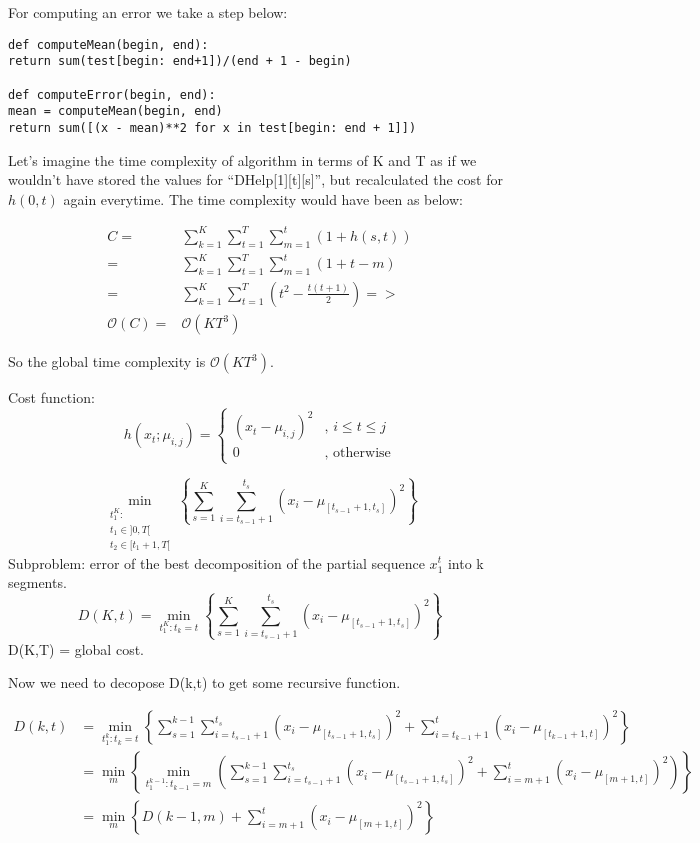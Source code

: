 For computing an error we take a step below: \\
\begin{lstlisting}
def computeMean(begin, end):
return sum(test[begin: end+1])/(end + 1 - begin)

def computeError(begin, end):
mean = computeMean(begin, end)
return sum([(x - mean)**2 for x in test[begin: end + 1]])	
\end{lstlisting}

Let's imagine the time complexity of algorithm in terms of K and T as if we wouldn't have 
stored the values for ``DHelp[1][t][s]'', but recalculated the cost for $h(0,t)$ again everytime.
The time complexity would have been as below:  

\begin{align}
C =& \sum_{k=1}^{K}\sum_{t=1}^{T}\sum_{m=1}^{t}(1 + h(s,t)) \\
  =& \sum_{k=1}^{K}\sum_{t=1}^{T}\sum_{m=1}^{t}(1 + t-m) \\
  =& \sum_{k=1}^{K}\sum_{t=1}^{T}(t^2- \frac{t(t+1)}{2}) => \\
\mathcal{O}(C) =& \mathcal{O}(KT^3)
\end{align}

So the global time complexity is $\mathcal{O}(KT^3)$.

Cost function: 
\[h(x_t;\mu_{i,j})=
\begin{cases}
(x_t-\mu_{i,j})^2 & \text{, } i\leq t\leq j\\
0 & \text{, otherwise}
\end{cases}\]

\[\min_{\substack{t_1^K:\\t_1\in]0,T[\\t_2\in[t_1+1,T[}}
{\left\{\sum_{s=1}^{K}
{\sum_{i=t_{s-1}+1}^{t_s}
{\left(x_i-\mu_{[t_{s-1}+1,t_s]}\right)^2}}\right\}}\]
Subproblem: error of the best decomposition of the partial sequence \(x_1^t\) into k segments.
\[D(K,t)=\min_{t_1^K:t_k=t}
{\left\{\sum_{s=1}^{K}
{\sum_{i=t_{s-1}+1}^{t_s}
{\left(x_i-\mu_{[t_{s-1}+1,t_s]}\right)^2}}\right\}}\]
D(K,T) = global cost.

Now we need to decopose D(k,t) to get some recursive function.

\begin{equation*}
\begin{aligned}
D(k,t)&=\min_{t_1^k:t_k=t}
{\left\{\sum_{s=1}^{k-1}
{\sum_{i=t_{s-1}+1}^{t_s}
{\left(x_i-\mu_{[t_{s-1}+1,t_s]}\right)^2+
\sum_{i=t_{k-1}+1}^{t}
{\left(x_i-\mu_{[t_{k-1}+1,t]}\right)^2}}}\right\}}\\
&=\min_{m}
{\left\{\min_{t_1^{k-1}:t_{k-1}=m}
{\left(\sum_{s=1}^{k-1}
{\sum_{i=t_{s-1}+1}^{t_s}
{\left(x_i-\mu_{[t_{s-1}+1,t_s]}\right)^2+
\sum_{i=m+1}^{t}
{\left(x_i-\mu_{[m+1,t]}\right)^2}}}\right)}\right\}}\\
&=\min_{m}{\left\{D(k-1,m)+
\sum_{i=m+1}^{t}
{\left(x_i-\mu_{[m+1,t]}\right)^2}\right\}}
\end{aligned}
\end{equation*}


